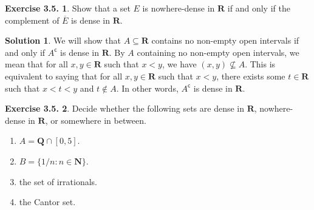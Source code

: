 \documentclass[12pt]{article}
\theoremstyle{definition}
\theoremstyle{exercise}
\newtheorem{exercise}{Exercise 3.5.}
\theoremstyle{solution}
\newtheorem*{solution}{Solution}
\newcommand{\setcomp}[1]{#1^{\mathsf{c}}}
\newcommand{\N}{\mathbf{N}}
\newcommand{\Q}{\mathbf{Q}}
\newcommand{\R}{\mathbf{R}}
\begin{document}
\begin{exercise}
\label{ex:8}
    Show that a set \( E \) is nowhere-dense in \( \R \) if and only if the complement of \( \overline{E} \) is dense in \( \R \).
\end{exercise}

\begin{solution}
    We will show that \( A \subseteq \R \) contains no non-empty open intervals if and only if \( \setcomp{A} \) is dense in \( \R \). By \( A \) containing no non-empty open intervals, we mean that for all \( x, y \in \R \) such that \( x < y \), we have \( (x, y) \not\subseteq A \). This is equivalent to saying that for all \( x, y \in \R \) such that \( x < y \), there exists some \( t \in \R \) such that \( x < t < y \) and \( t \not\in A \). In other words, \( \setcomp{A} \) is dense in \( \R \).
\end{solution}

\begin{exercise}
\label{ex:9}
    Decide whether the following sets are dense in \( \R \), nowhere-dense in \( \R \), or somewhere in between.
    \begin{enumerate}
        \item \( A = \Q \cap [0, 5] \).

        \item \( B = \{ 1/n : n \in \N \} \).

        \item the set of irrationals.

        \item the Cantor set.
    \end{enumerate}
\end{exercise}
\end{document}
